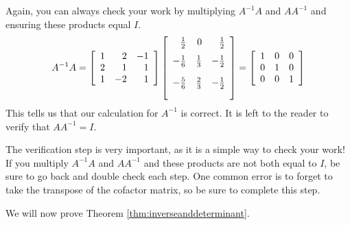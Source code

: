 \begin{solution}
Again, you can always check your work by multiplying $A^{-1}A$ and $AA^{-1}$ and ensuring these products equal $I$.
\begin{equation*}
A^{-1}A = 
\leftB
\begin{array}{rrr}
1 & 2 & -1 \\
2 & 1 & 1 \\
1 & -2 & 1
\end{array}
\rightB \leftB
\begin{array}{rrr}
\vspace{0.05in}\frac{1}{2} & 0 & \vspace{0.05in}\frac{1}{2} \\
-\vspace{0.05in}\frac{1}{6} & \vspace{0.05in}\frac{1}{3} & -\vspace{0.05in}
\frac{1}{2} \\
-\vspace{0.05in}\frac{5}{6} & \vspace{0.05in}\frac{2}{3} & -\vspace{0.05in}
\frac{1}{2}
\end{array}
\rightB = \leftB
\begin{array}{rrr}
1 & 0 & 0 \\
0 & 1 & 0 \\
0 & 0 & 1
\end{array}
\rightB
\end{equation*}
This tells us that our calculation for $A^{-1}$ is correct. It is left to the reader to verify that $AA^{-1} = I$. 
\end{solution}

The verification step is very important, as it is a simple way to check your work! If you multiply $A^{-1}A$ and $AA^{-1}$ and
these products are not both equal to $I$, be sure to go back and double check each step. 
One common error is to forget to take the transpose of the cofactor matrix, so be sure to complete this step.

We will now prove Theorem \ref{thm:inverseanddeterminant}.

